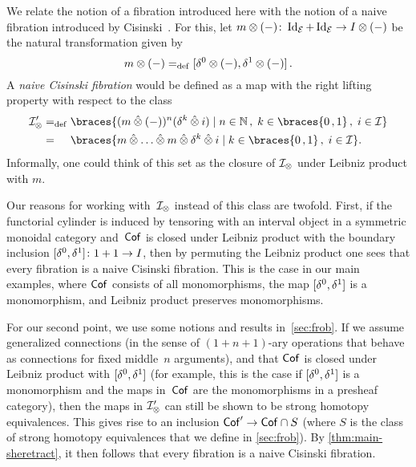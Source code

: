 \documentclass[reqno,10pt,a4paper,oneside,draft]{amsart}
\begin{document}
\begin{remark} \label{cisinski-remark}
We relate the notion of a fibration introduced here with the notion of a naive fibration introduced by Cisinski~\cite{cisinski-asterisque}.
For this, let $m \otimes (-)  \co \Id_\catE + \Id_\catE \to \interval \otimes (-)$ be the natural transformation
given by
\[
m \otimes (-) \defeq [\lcyl \otimes (-), \rcyl \otimes (-)]
\, .\]
A \emph{naive Cisinski fibration} would be defined as a map with the right lifting property with respect to the class
\begin{align*}
\cal{I}_\otimes'
&\defeq
\braces{(m \hatotimes (-))^n (\kcyl \hatotimes i) \mid n \in \mathbb{N} \, , \; k \in \braces{0\,,1} \, , \;  i \in \cal{I} }
\\
&=_{\phantom{\operatorname{def}}}
\braces{m \hatotimes \ldots \hatotimes m \hatotimes \kcyl \hatotimes i \mid k \in \braces{0\,,1} \, , \;  i \in \cal{I} } \rlap{.}
\end{align*}
Informally, one could think of this set as the closure of $\cal{I}_\otimes$ under Leibniz product with $m$.

Our reasons for working with~$\cal{I}_\otimes$ instead of this class are twofold.
First, if the functorial cylinder is induced by tensoring with an interval object in a symmetric monoidal category and~$\Cof$ is closed under Leibniz product with the boundary inclusion $[\lcyl, \rcyl] \co 1 + 1 \to \interval$, then by permuting the Leibniz product one sees that every fibration is a naive Cisinski fibration.
This is the case in our main examples, where $\Cof$ consists of all monomorphisms, the map $[\lcyl, \rcyl]$ is a monomorphism, and Leibniz product preserves monomorphisms.

For our second point, we use some notions and results in~\cref{sec:frob}.
If we assume generalized connections (in the sense of $(1+n+1)$-ary operations that behave as connections for fixed middle~$n$ arguments), and that $\Cof$ is closed under Leibniz product with $[\lcyl, \rcyl]$ (for example, this is the case if $[\lcyl, \rcyl]$ is a monomorphism and the maps in~$\Cof$ are the monomorphisms in a presheaf category), then the maps in $\cal{I}'_\otimes$ can still be shown to be strong homotopy equivalences.
This gives rise to an inclusion $\Cof' \to \Cof \cap S$ (where $S$ is the class of strong homotopy equivalences that we define in \cref{sec:frob}).
By \cref{thm:main-sheretract}, it then follows that every fibration is a naive Cisinski fibration.
\end{remark}
\end{document}
